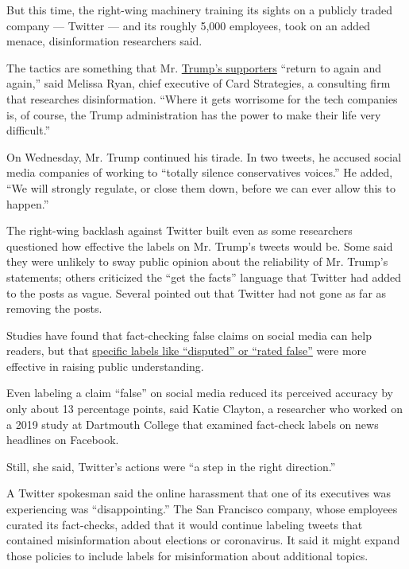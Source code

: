 But this time, the right-wing machinery training its sights on a
publicly traded company --- Twitter --- and its roughly 5,000 employees,
took on an added menace, disinformation researchers said.

The tactics are something that Mr.
\href{https://www.nytimes3xbfgragh.onion/2020/06/21/us/politics/trump-rally-supporters.html}{Trump's
supporters} ``return to again and again,'' said Melissa Ryan, chief
executive of Card Strategies, a consulting firm that researches
disinformation. ``Where it gets worrisome for the tech companies is, of
course, the Trump administration has the power to make their life very
difficult.''

On Wednesday, Mr. Trump continued his tirade. In two tweets, he accused
social media companies of working to ``totally silence conservatives
voices.'' He added, ``We will strongly regulate, or close them down,
before we can ever allow this to happen.''

The right-wing backlash against Twitter built even as some researchers
questioned how effective the labels on Mr. Trump's tweets would be. Some
said they were unlikely to sway public opinion about the reliability of
Mr. Trump's statements; others criticized the ``get the facts'' language
that Twitter had added to the posts as vague. Several pointed out that
Twitter had not gone as far as removing the posts.

Studies have found that fact-checking false claims on social media can
help readers, but that
\href{https://www.dartmouth.edu/~nyhan/fake-news-solutions.pdf}{specific
labels like ``disputed'' or ``rated false''} were more effective in
raising public understanding.

Even labeling a claim ``false'' on social media reduced its perceived
accuracy by only about 13 percentage points, said Katie Clayton, a
researcher who worked on a 2019 study at Dartmouth College that examined
fact-check labels on news headlines on Facebook.

Still, she said, Twitter's actions were ``a step in the right
direction.''

A Twitter spokesman said the online harassment that one of its
executives was experiencing was ``disappointing.'' The San Francisco
company, whose employees curated its fact-checks, added that it would
continue labeling tweets that contained misinformation about elections
or coronavirus. It said it might expand those policies to include labels
for misinformation about additional topics.

